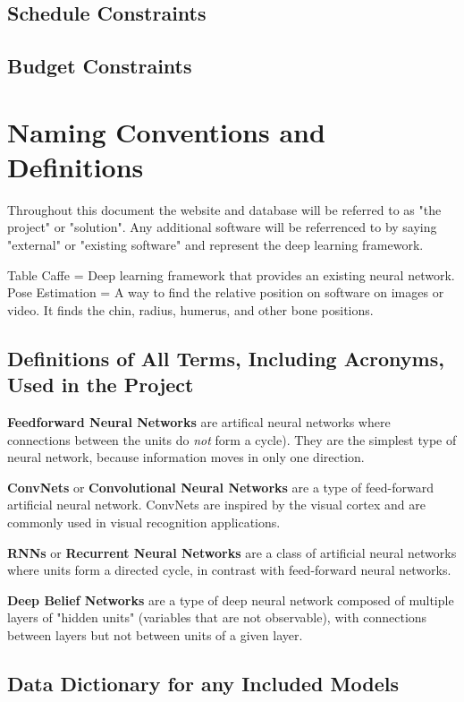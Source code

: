 \documentclass{scrreprt}
\begin{document}
\subsection{Schedule Constraints}

\subsection{Budget Constraints}

\section{Naming Conventions and Definitions}

Throughout this document the website and database will be referred to as "the
project" or "solution". Any additional software will be referrenced to by
saying "external" or "existing software" and represent the deep learning
framework.

Table
Caffe = Deep learning framework that provides an existing neural network.
Pose Estimation = A way to find the relative position on software on images or
video. It finds the chin, radius, humerus, and other bone positions.

\subsection{Definitions of All Terms, Including Acronyms, Used in the Project}

\textbf{Feedforward Neural Networks} are artifical neural networks where
connections between the units do \textit{not} form a cycle). They are the
simplest type of neural network, because information moves in only one
direction.

\textbf{ConvNets} or \textbf{Convolutional Neural Networks} are a type of
feed-forward artificial neural network. ConvNets are inspired by the visual
cortex and are commonly used in visual recognition applications.

\textbf{RNNs} or \textbf{Recurrent Neural Networks} are a class of artificial
neural networks where units form a directed cycle, in contrast with
feed-forward neural networks.

\textbf{Deep Belief Networks} are a type of deep neural network composed of
multiple layers of "hidden units" (variables that are not observable), with
connections between layers but not between units of a given layer.

\subsection{Data Dictionary for any Included Models}
\end{document}
